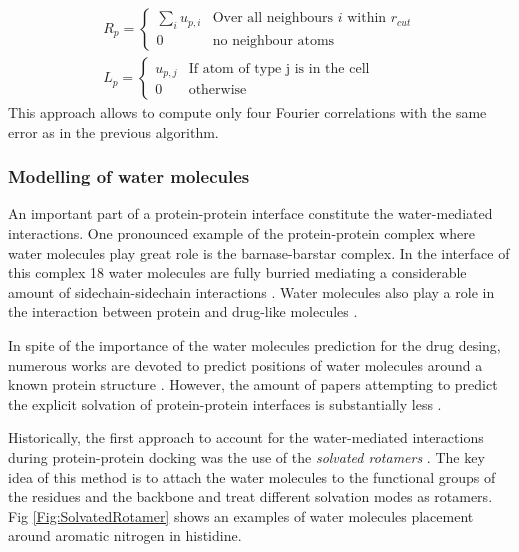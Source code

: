\begin{eqnarray*}
 R_{p}=\begin{cases}
                  \sum_i u_{p,i} & \mbox{Over all neighbours $i$ within }r_{cut}\\
                  0 & \mbox{no neighbour atoms}
                 \end{cases}\\
 L_{p}=\begin{cases}
                  u_{p,j} & \mbox{If atom of type j is in the cell}\\
                  0 & \mbox{otherwise}
                 \end{cases}
\end{eqnarray*}
This approach allows to compute only four Fourier correlations with the same error as in the previous algorithm.

\subsubsection{Modelling of water molecules}

An important part of a protein-protein interface constitute the water-mediated interactions. One pronounced example of the protein-protein complex where 
water molecules play great role is the barnase-barstar complex. In the interface of this complex 18 water molecules are fully burried mediating a considerable 
amount of sidechain-sidechain interactions \cite{buckle1994protein}. Water molecules also play a role in the interaction 
between protein and drug-like molecules \cite{ben2002molecular,huggins2011systematic}. 

In spite of the importance of the water molecules prediction for the drug desing, numerous works are devoted to predict positions of water molecules 
around a known protein structure \cite{forli2012force, wang2011ligand, ross2012rapid}. However, the amount of papers attempting to predict the explicit solvation of protein-protein 
interfaces is substantially less \cite{jiang2005solvated,bui2007watgen,kastritis2013solvated,ahmad2011adhesive}.

Historically, the first approach to account for the water-mediated interactions during protein-protein docking was the use of the \emph{solvated rotamers} \cite{jiang2005solvated}. The key idea
of this method is to attach the water molecules to the functional groups of the residues and the backbone and treat different solvation modes as rotamers. Fig \ref{Fig:SolvatedRotamer} shows
an examples of water molecules placement around aromatic nitrogen in histidine.

